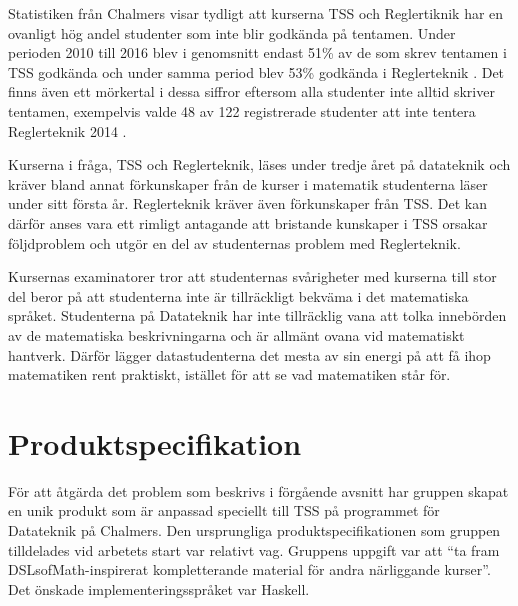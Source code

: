 \documentclass[]{article}
\begin{document}
Statistiken från Chalmers visar tydligt att kurserna TSS och Reglertiknik
har en ovanligt hög andel studenter som inte blir godkända på tentamen.
Under perioden 2010 till 2016 blev i genomsnitt endast 51\% av de som skrev
tentamen i TSS godkända och under samma period blev 53\% godkända i
Reglerteknik \cite{tentastatistik}.
Det finns även ett mörkertal i dessa siffror eftersom alla studenter
inte alltid skriver tentamen, exempelvis valde 48 av 122 registrerade
studenter att inte tentera Reglerteknik 2014
\cite{kursinformation:ere102:14-15}.

Kurserna i fråga, TSS och Reglerteknik, läses under tredje året på
datateknik och kräver bland annat förkunskaper från de kurser i matematik
studenterna läser under sitt första år. Reglerteknik kräver även förkunskaper
från TSS. Det kan därför anses vara ett rimligt antagande att bristande
kunskaper i TSS orsakar följdproblem och utgör en del av studenternas
problem med Reglerteknik.

Kursernas examinatorer tror att studenternas svårigheter med kurserna till
stor del beror på att studenterna inte är tillräckligt bekväma
i det matematiska språket. Studenterna på Datateknik har inte tillräcklig
vana att tolka innebörden av de matematiska beskrivningarna och är allmänt
ovana vid matematiskt hantverk. Därför lägger datastudenterna det mesta av
sin energi på att få ihop matematiken rent praktiskt,
istället för att se vad matematiken står för.

\section{Produktspecifikation}


För att åtgärda det problem som beskrivs i förgående avsnitt har gruppen skapat
en unik produkt som är anpassad speciellt till TSS på programmet för Datateknik
på Chalmers. Den ursprungliga produktspecifikationen som gruppen tilldelades vid
arbetets start var relativt vag. Gruppens uppgift var att ``ta fram
DSLsofMath-inspirerat kompletterande material för andra närliggande kurser''.
Det önskade implementeringsspråket var Haskell.
\end{document}

